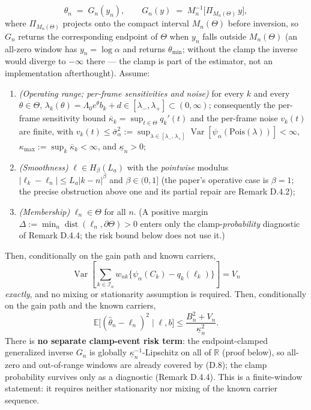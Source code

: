 \begin{equation}
\hat\theta_n\;=\;G_n(y_n),
\qquad
G_n(y)\;=\;M_n^{-1}\!\big[\Pi_{M_n(\Theta)}\,y\big], \tag{D.8a}
\end{equation}
where $\Pi_{M_n(\Theta)}$ projects onto the compact interval $M_n(\Theta)$ before inversion, so $G_n$ returns the corresponding endpoint of $\Theta$ when $y_n$ falls outside $M_n(\Theta)$ (an all-zero window has $y_n=\log\alpha$ and returns $\theta_{\min}$; without the clamp the inverse would diverge to $-\infty$ there --- the clamp is part of the estimator, not an implementation afterthought). Assume:
\begin{enumerate}
\item \emph{(Operating range; per-frame sensitivities and noise)} for every $k$ and every $\theta\in\Theta$, $\lambda_k(\theta)=\Lambda_0e^{\theta}b_k+d\in[\lambda_-,\lambda_+]\subset(0,\infty)$; consequently the per-frame sensitivity bound $\overline\kappa_k=\sup_{t\in\Theta}q_k'(t)$ and the per-frame noise $v_k(t)$ are finite, with $v_k(t)\le\bar\sigma_\alpha^2:=\sup_{\lambda\in[\lambda_-,\lambda_+]}\operatorname{Var}[\psi_\alpha(\mathrm{Pois}(\lambda))]<\infty$, $\kappa_{\max}:=\sup_k\overline\kappa_k<\infty$, and $\underline\kappa_n>0$;
\item \emph{(Smoothness)} $\ell\in H_\beta(L_a)$ with the \emph{pointwise} modulus $|\ell_k-\ell_n|\le L_a|k-n|^{\beta}$ and $\beta\in(0,1]$ (the paper's operative case is $\beta=1$; the precise obstruction above one and its partial repair are Remark D.4.2);
\item \emph{(Membership)} $\ell_n\in\Theta$ for all $n$. (A positive margin $\Delta:=\min_n\operatorname{dist}(\ell_n,\partial\Theta)>0$ enters only the clamp-\emph{probability} diagnostic of Remark D.4.4; the risk bound below does not use it.)
\end{enumerate}
Then, conditionally on the gain path and known carriers,
\[
\operatorname{Var}\!\left[
\sum_{k\in\mathcal I_n}w_{nk}
\{\psi_\alpha(C_k)-q_k(\ell_k)\}\right]
=V_n
\]
\emph{exactly}, and no mixing or stationarity assumption is required. Then, conditionally on the gain path and the known carriers,
\begin{equation}
\mathbb E\big[(\hat\theta_n-\ell_n)^2\mid\ell,b\big]
\le
\frac{B_n^2+V_n}{\underline\kappa_n^2}.
\tag{D.8}
\end{equation}
There is \textbf{no separate clamp-event risk term}: the endpoint-clamped generalized inverse $G_n$ is globally $\underline\kappa_n^{-1}$-Lipschitz on all of $\mathbb R$ (proof below), so all-zero and out-of-range windows are already covered by (D.8); the clamp probability survives only as a diagnostic (Remark D.4.4). This is a finite-window statement: it requires neither stationarity nor mixing of the known carrier sequence.
